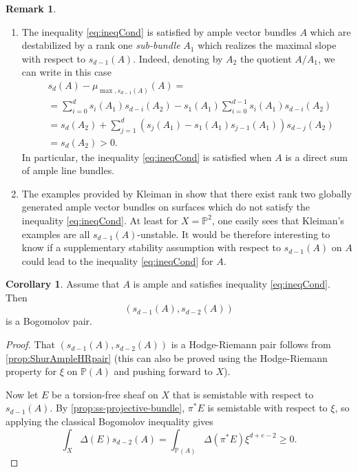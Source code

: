 \documentclass[a4,reqno]{amsart}
\theoremstyle{definition}
\newtheorem{corollary}[theorem]{Corollary}
\newtheorem{remark}[theorem]{Remark}
\renewcommand{\P}{\mathbb{P}}
\numberwithin{equation}{section}
\begin{document}
\begin{remark}
\begin{enumerate}
    \item The inequality \eqref{eq:ineqCond} is satisfied by ample vector bundles $A$ which are destabilized by a rank one {\em sub-bundle} $A_1$ which realizes the maximal slope with respect to $s_{d-1}(A)$. Indeed, denoting by $A_2$ the quotient $A/A_1$, we can write in this case
    \begin{align*}
        &s_d(A)-\mu_{\max,s_{d-1}(A)}(A)= \\
        &= \sum_{i=0}^d s_i(A_1)s_{d-i}(A_2)-s_1(A_1)\sum_{i=0}^{d-1} s_i(A_1)s_{d-i}(A_2) \\
     &= s_d(A_2)+\sum_{j=1}^d(s_j(A_1)-s_1(A_1)s_{j-1}(A_1))s_{d-j}(A_2)\\
     &= s_d(A_2)>0.
    \end{align*}
    In particular, the inequality \eqref{eq:ineqCond} is satisfied when $A$ is a direct sum of ample line bundles. 
    \item
   The examples provided by Kleiman in  \cite[Example 5]{Kleiman} show that there exist rank two globally generated ample vector bundles on surfaces which do not satisfy the inequality \eqref{eq:ineqCond}. At least for $X=\P^2$, one easily sees that Kleiman's examples are all $s_{d-1}(A)$-unstable. It would be therefore interesting to know if a supplementary stability assumption with respect to $s_{d-1}(A)$ on $A$ could lead to the inequality \eqref{eq:ineqCond} for $A$.  
\end{enumerate}
\end{remark}

\begin{corollary}\label{cor:segrebogomolovpairI}
Assume that $A$ is ample and satisfies inequality \eqref{eq:ineqCond}. Then $$(s_{d-1}(A),s_{d-2}(A))$$ is a Bogomolov pair.
\end{corollary}
\begin{proof}
 That $(s_{d-1}(A),s_{d-2}(A))$ is a Hodge-Riemann pair  follows from \cref{prop:ShurAmpleHRpair} (this can also be proved using the Hodge-Riemann property for $\xi$ on $\mathbb P(A)$ and pushing forward to $X$). 

Now let $E$ be a torsion-free sheaf on $X$ that is semistable with respect to $s_{d-1}(A)$. By \cref{prop:ss-projective-bundle}, $\pi^*E$ is semistable with respect to $\xi$, so applying the classical Bogomolov inequality gives
$$\int_X \Delta(E) s_{d-2}(A) = \int_{\mathbb P(A)} \Delta(\pi^* E)\xi^{d+e-2}\ge 0.$$
\end{proof}
\end{document}

